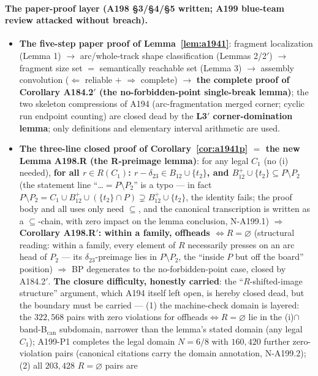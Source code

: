 \paragraph{The paper-proof layer (A198 \S3/\S4/\S5 written; A199 blue-team
review attacked without breach).}
\begin{itemize}
\item \textbf{The five-step paper proof of Lemma~\ref{lem:a1941}}:
fragment localization (Lemma 1) $\to$ arc/whole-track shape classification
(Lemmas 2/2$'$) $\to$ fragment size set $=$ semantically reachable set
(Lemma 3) $\to$ assembly convolution ($\Leftarrow$ reliable $+$
$\Rightarrow$ complete) $\to$ \textbf{the complete proof of Corollary
A184.2$'$ (the no-forbidden-point single-break lemma)}; the two skeleton
compressions of A194 (arc-fragmentation merged corner; cyclic run endpoint
counting) are closed dead by the \textbf{L3$'$ corner-domination lemma};
only definitions and elementary interval arithmetic are used.
\item \textbf{The three-line closed proof of Corollary~\ref{cor:a1941p}
$=$ the new Lemma A198.R (the R-preimage lemma)}: for any legal $C_1$ (no
(i) needed), \textbf{for all $r\in R(C_1)$: $r-\delta_{23}\in
B_{12}\cup\{t_2\}$, and $B_{12}^+\cup\{t_2\}\subseteq P\setminus P_2$} (the
statement line ``\dots$=P\setminus P_2$'' is a typo --- in fact
$P\setminus P_2=C_1\cup B_{12}^+\cup(\{t_2\}\cap P)\supsetneq
B_{12}^+\cup\{t_2\}$, the identity fails; the proof body and all uses only
need $\subseteq$, and the canonical transcription is written as a
$\subseteq$-chain, with zero impact on the lemma conclusion, N-A199.1)
$\Rightarrow$ \textbf{Corollary A198.R$'$: within a family, offheads
$\iff R=\varnothing$} (structural reading: within a family, every element
of $R$ necessarily presses on an arc head of $P_2$ --- its
$\delta_{23}$-preimage lies in $P\setminus P_2$, the ``inside $P$ but off
the board'' position) $\Rightarrow$ BP degenerates to the
no-forbidden-point case, closed by A184.2$'$. \textbf{The closure
difficulty, honestly carried}: the ``$R$-shifted-image structure'' argument,
which A194 itself left open, is hereby closed dead, but the boundary must be
carried --- (1) the machine-check domain is layered: the $322{,}568$ pairs
with zero violations for offheads$\iff R=\varnothing$ lie in the (i)$\cap$
band-B$_\mathrm{can}$ subdomain, narrower than the lemma's stated domain
(any legal $C_1$); A199-P1 completes the legal domain $N=6/8$ with
$160{,}420$ further zero-violation pairs (canonical citations carry the
domain annotation, N-A199.2); (2) all $203{,}428$ $R=\varnothing$ pairs are

\end{itemize}

